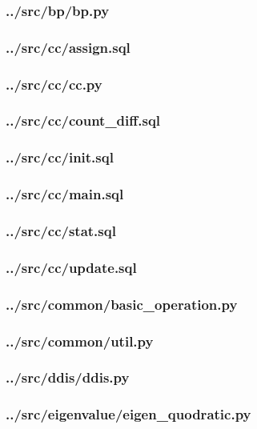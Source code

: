 \subsubsection{../src/bp/bp.py}

\subsubsection{../src/cc/assign.sql}

\subsubsection{../src/cc/cc.py}

\subsubsection{../src/cc/count\_diff.sql}

\subsubsection{../src/cc/init.sql}

\subsubsection{../src/cc/main.sql}

\subsubsection{../src/cc/stat.sql}

\subsubsection{../src/cc/update.sql}

\subsubsection{../src/common/basic\_operation.py}

\subsubsection{../src/common/util.py}

\subsubsection{../src/ddis/ddis.py}

\subsubsection{../src/eigenvalue/eigen\_quodratic.py}

